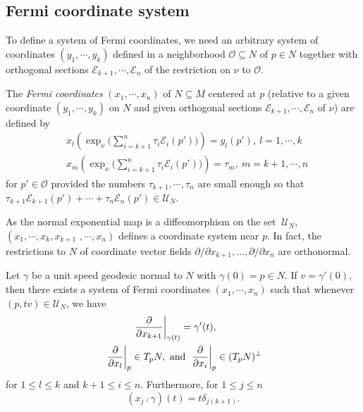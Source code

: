 \subsection{Fermi coordinate system} 
\hfb To define a system of Fermi coordinates, we need an arbitrary system of coordinates $\left(y_1,\cdots,y_k\right)$ defined in a neighborhood $\mathcal{O}\subseteq N$ of $p\in N$ together with orthogonal sections $\mathcal{E}_{k+1},\cdots,\mathcal{E}_n$ of the restriction on $\nu$ to $\mathcal{O}$.
\begin{defn}\label{Defn:FermiCoordinates}
    The \textit{Fermi coordinates} $\left(x_1,\cdots,x_n\right)$ of $N\subseteq M$ centered at $p$ (relative to a given coordinate $\left(y_1,\cdots,y_k\right)$ on $N$ and given orthogonal sections $\mathcal{E}_{k+1},\cdots,\mathcal{E}_n$ of $\nu$) are defined by
    \begin{align*}
        & x_l \left(\exp_{\nu} \bigg(\sum_{i=k+1}^n \tau_i \mathcal{E}_i \left(p'\right)\bigg)\right) = y_l \left(p'\right),~ l = 1,\cdots,k 
        \\[1ex]
        & x_m \left(\exp_{\nu} \bigg(\sum_{i=k+1}^n \tau_i \mathcal{E}_i \left(p'\right)\bigg)\right) = \tau_m,~ m = k+1,\cdots,n
    \end{align*}
    for $p'\in \mathcal{O}$ provided the numbers $\tau_{k+1},\cdots,\tau_n$ are small enough so that $\tau_{k+1}\mathcal{E}_{k+1}\left(p'\right)+\cdots+\tau_{n}\mathcal{E}_{n}\left(p'\right)\in \mathcal{U}_N$. 
\end{defn}

\bigskip 

\hf As the normal exponential map is a diffeomorphism on the set $~\mathcal{U}_N$, $\left(x_1,\cdots,x_k,x_{k+1}\right.$ $\left.,\cdots, x_n\right)$ defines a coordinate system near $p$. In fact, the restrictions to $N$ of coordinate vector fields $ \allowbreak\partial/\partial x_{k+1},\ldots, \partial/ \partial x_n$ are orthonormal.
\begin{lemma} \label{Lemma: geodesic in fermi}
    Let $\gamma$ be  a unit speed geodesic normal to $N$ with $\gamma(0) = p\in N$. If $v = \gamma'(0)$, then there exists a system of Fermi coordinates $(x_1,\cdots,x_n)$ such that whenever $(p,tv)\in \mathcal{U}_N$, we have
    \begin{align*}
        & \kern 1cm\left.\dfrac{\partial}{\partial x_{k+1}}\right|_{\gamma(t)} = \gamma'(t),\\
        & \left.\dfrac{\partial}{\partial x_l}\right|_p\in T_pN, \text{ and } \left.\dfrac{\partial}{\partial x_i}\right|_p \in (T_p N)^\perp
    \end{align*}
    for $1\le l\le k$ and $k+1\le i\le n.$ Furthermore, for $1\le j \le n$
    \begin{displaymath}
        (x_j \comp \gamma)(t) = t\delta_{j (k+1)}.
    \end{displaymath}
\end{lemma}

